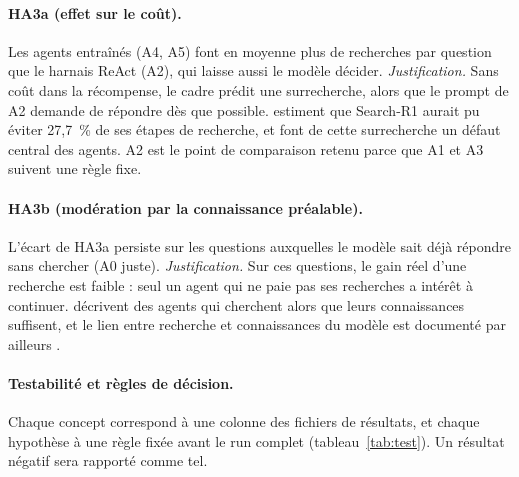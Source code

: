 \paragraph{HA3a (effet sur le coût).} Les agents entraînés (A4, A5) font en moyenne plus de recherches par question que le harnais ReAct (A2), qui laisse aussi le modèle décider.
\emph{Justification.} Sans coût dans la récompense, le cadre prédit une surrecherche, alors que le prompt de A2 demande de répondre dès que possible. \citet{wu2025search} estiment que Search-R1 aurait pu éviter 27,7~\% de ses étapes de recherche, et \citet{tang2026saas} font de cette surrecherche un défaut central des agents. A2 est le point de comparaison retenu parce que A1 et A3 suivent une règle fixe.

\paragraph{HA3b (modération par la connaissance préalable).} L'écart de HA3a persiste sur les questions auxquelles le modèle sait déjà répondre sans chercher (A0 juste).
\emph{Justification.} Sur ces questions, le gain réel d'une recherche est faible : seul un agent qui ne paie pas ses recherches a intérêt à continuer. \citet{tang2026saas} décrivent des agents qui cherchent alors que leurs connaissances suffisent, et le lien entre recherche et connaissances du modèle est documenté par ailleurs \citep{mallen2022when,yin2023do}.

\paragraph{Testabilité et règles de décision.} Chaque concept correspond à une colonne des fichiers de résultats, et chaque hypothèse à une règle fixée avant le run complet (tableau~\ref{tab:test}). Un résultat négatif sera rapporté comme tel.

